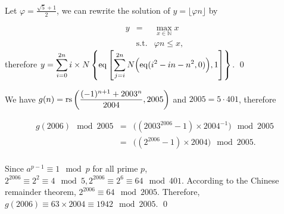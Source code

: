 \documentclass[11pt]{article}
\begin{document}



\begin{pf} \rm
Let $\varphi = \frac{\sqrt{5}+1}{2}$, we can rewrite the solution of 
$y=\lfloor \varphi n\rfloor$ by

\[
\begin{array}{rcl}
 y &= & \displaystyle \max_{x\in\mathbb{N}} x \\
 & \mathrm{s.t.} & \varphi n \leq x,
\end{array}
\]
\noindent
therefore
$ \displaystyle y = 
 \sum_{i = 0}^{2n}
 i\times N \left\{
 \mathrm{eq} \left[
  \sum_{j = i}^{2n} N\Big(\mathrm{eq}(i^2 - in - n^2, 0)\Big)
 , 1
 \right] \right\} $.
\qed
\end{pf}






\begin{pf} \rm
We have $\displaystyle g(n) = \mathrm{rs} \left( \frac{(-1)^{n+1} + 2003^n}{2004} , 2005 \right)$
and $2005=5\cdot 401$, therefore
 
\[
 \begin{array}{rcl}
   g(2006) \mod 2005 & = & \Big((2003^{2006} - 1) \times 2004^{-1} \Big) \mod 2005 \\
                     & = & \Big((2^{2006} - 1) \times 2004\Big) \mod 2005. \\
 \end{array}
\]

Since $a^{p-1} \equiv 1\mod p$ for all prime $p$,
$2^{2006} \equiv 2^2 \equiv 4\mod 5, 2^{2006} \equiv 2^6 \equiv 64 \mod 401$.
According to the Chinese remainder theorem,
$2^{2006} \equiv 64\mod 2005$. Therefore, $g(2006) \equiv 63\times2004
\equiv 1942\mod 2005$. \qed

\end{pf}



\newpage
\end{document}
